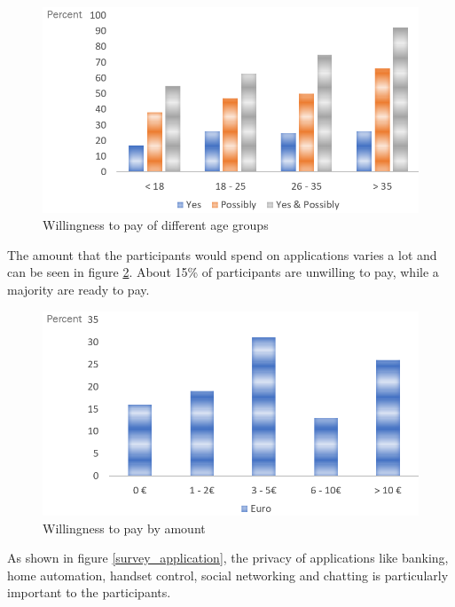 \begin{figure}[h]
	\centering
	\includegraphics[width=0.9\linewidth]{Picture/umfrage_geld_gruppen}
	\caption[Willingness to pay of different age groups]{Willingness to pay of different age groups}
	\label{fig:umfrage_geld_gruppen}
\end{figure}

The amount that the participants would spend on applications varies a lot and can be seen in figure \ref{fig:umfrage_betrag}. About 15\% of participants are unwilling to pay, while a majority are ready to pay.

\begin{figure}[h]
	\centering
	\includegraphics[width=0.9\linewidth]{Picture/umfrage_betrag}
	\caption[Willingness to pay by amount]{Willingness to pay by amount}
	\label{fig:umfrage_betrag}
\end{figure}

As shown in figure \ref{survey_application}, the privacy of applications like banking, home automation, handset control, social networking and chatting is particularly important to the participants.

